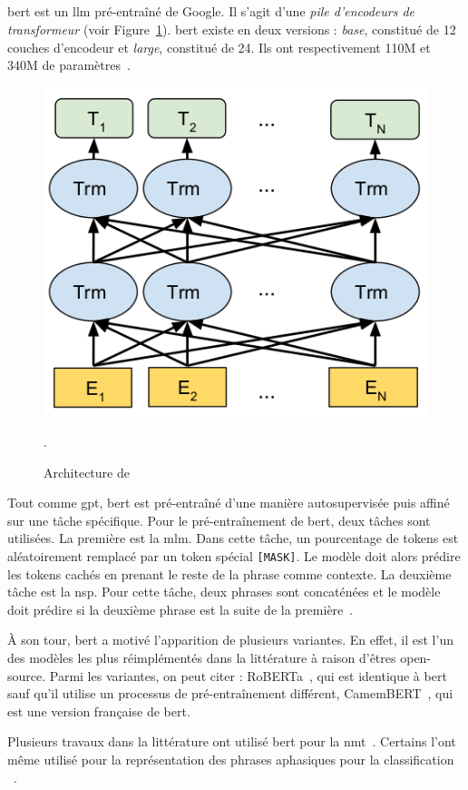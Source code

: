 \subsection{}

\Gls{bert} est un \gls{llm} pré-entraîné de Google.
Il s'agit d'une \emph{pile d'encodeurs de transformeur} (voir Figure~\ref{fig.bert}).
\gls{bert} existe en deux versions : 
\emph{base}, constitué de 12 couches d'encodeur et \emph{large}, constitué de 24. 
Ils ont respectivement 110M et 340M de paramètres~\cite{Devlin_Chang_Lee_Toutanova_2019}.

\begin{figure}[hbt]
    \centering
    \includegraphics[width=.6\linewidth]{assets/images/bert.png}
    \caption[Architecture de .]%
    {Architecture de ~\cite{Devlin_Chang_Lee_Toutanova_2019}}.
    \label{fig.bert}
\end{figure}

Tout comme \gls{gpt}, \gls{bert} est pré-entraîné d'une manière autosupervisée
puis affiné sur une tâche spécifique.
Pour le pré-entraînement de \gls{bert}, deux tâches sont utilisées.
La première est la \gls{mlm}.
Dans cette tâche, un pourcentage de tokens est aléatoirement remplacé par un token spécial \texttt{[MASK]}.
Le modèle doit alors prédire les tokens cachés en prenant le reste de la phrase comme contexte.
La deuxième tâche est la \gls{nsp}.
Pour cette tâche, deux phrases sont concaténées 
et le modèle doit prédire si la deuxième phrase est la suite de la première~\cite{Devlin_Chang_Lee_Toutanova_2019}.

À son tour, \gls{bert} a motivé l'apparition de plusieurs variantes.
En effet, il est l'un des modèles les plus réimplémentés dans la littérature à raison d'êtres open-source.
Parmi les variantes, on peut citer :
RoBERTa~\cite{Liu_Ott_Goyal_Du_Joshi_Chen_Levy_Lewis_Zettlemoyer_Stoyanov_2019},
qui est identique à \gls{bert} sauf qu'il utilise un processus de pré-entraînement différent,
CamemBERT~\cite{Martin_Muller_Ortiz_Suárez_Dupont_Romary_de_la_Clergerie_Seddah_Sagot_2020},
qui est une version française de \gls{bert}.

Plusieurs travaux dans la littérature ont utilisé \gls{bert}
pour la \gls{nmt}~\cite{Clinchant_Jung_Nikoulina_2019,Zhu_Xia_Wu_He_Qin_Zhou_Li_Liu_2020}.
Certains l'ont même utilisé pour la représentation des phrases aphasiques pour la classification%
~\cite{Qin_Lee_Kong_Lin_2022}.



